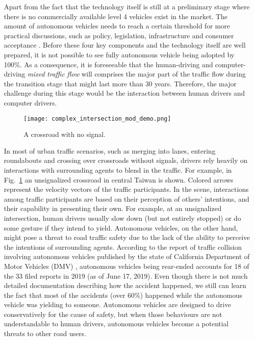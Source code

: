 Apart from the fact that the technology itself is still at a preliminary stage where there is no commercially available level 4 vehicles exist in the market. The amount of autonomous vehicles needs to reach a certain threshold for more practical discussions, such as policy, legislation, infrastructure and consumer acceptance \cite{litman2015}. Before these four key components and the technology itself are well prepared, it is not possible to see fully autonomous vehicle being adopted by 100\%. As a consequence, it is foreseeable that the human-driving and computer-driving \textit{mixed traffic flow} will comprises the major part of the traffic flow during the transition stage that might last more than 30 years. Therefore, the major challenge during this stage would be the interaction between human drivers and computer drivers.

\begin{figure}[htbp]
\begin{center}
\texttt{[image: complex\_intersection\_mod\_demo.png]}
\end{center}
\caption{A crossroad with no signal.}
\label{INTERSECTION} 
\end{figure}

In most of urban traffic scenarios, such as merging into lanes, entering roundabouts and crossing over crossroads without signals, drivers rely heavily on interactions with surrounding agents to blend in the traffic. For example, in Fig.~\ref{INTERSECTION} an unsignalized crossroad in central Taiwan is shown. Colored arrows represent the velocity vectors of the traffic participants. In the scene, interactions among traffic participants are based on their perception of others' intentions, and their capability in presenting their own. For example, at an unsignalized intersection, human drivers usually slow down (but not entirely stopped) or do some gesture if they intend to yield. Autonomous vehicles, on the other hand, might pose a threat to road traffic safety due to the lack of the ability to perceive the intentions of surrounding agents. According to the report of traffic collision involving autonomous vehicles published by the state of California Department of Motor Vehicles (DMV) \cite{CADMV}, autonomous vehicles being rear-ended accounts for 18 of the 33 filed reports in 2019 (as of June 17, 2019). Even though there is not much detailed documentation describing how the accident happened, we still can learn the fact that most of the accidents (over 60\%) happened while the autonomous vehicle was yielding to someone. Autonomous vehicles are designed to drive conservatively for the cause of safety, but when those behaviours are not understandable to human drivers, autonomous vehicles become a potential threats to other road users.

